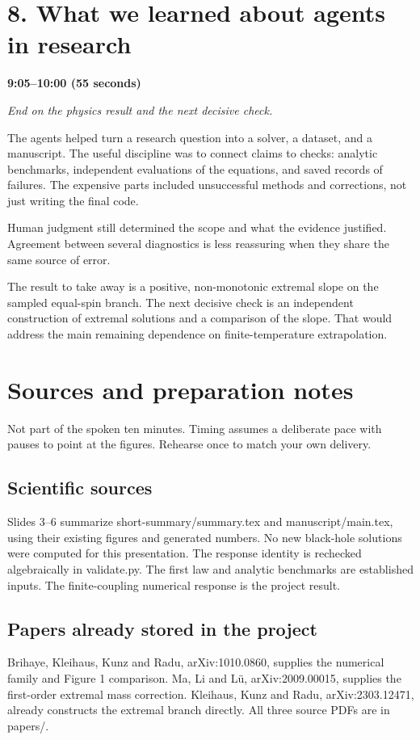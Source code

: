 \documentclass[12pt,a4paper]{article}
\begin{document}
\section*{8. What we learned about agents in research}
\textbf{9:05--10:00 (55 seconds)}\par
{\itshape End on the physics result and the next decisive check.}\par\medskip
The agents helped turn a research question into a solver, a dataset, and a manuscript. The useful discipline was to connect claims to checks: analytic benchmarks, independent evaluations of the equations, and saved records of failures. The expensive parts included unsuccessful methods and corrections, not just writing the final code.

Human judgment still determined the scope and what the evidence justified. Agreement between several diagnostics is less reassuring when they share the same source of error.

The result to take away is a positive, non-monotonic extremal slope on the sampled equal-spin branch. The next decisive check is an independent construction of extremal solutions and a comparison of the slope. That would address the main remaining dependence on finite-temperature extrapolation.
\newpage\section*{Sources and preparation notes}
Not part of the spoken ten minutes. Timing assumes a deliberate pace with pauses to point at the figures. Rehearse once to match your own delivery.
\subsection*{Scientific sources}
Slides 3--6 summarize short-summary/summary.tex and manuscript/main.tex, using their existing figures and generated numbers. No new black-hole solutions were computed for this presentation. The response identity is rechecked algebraically in validate.py. The first law and analytic benchmarks are established inputs. The finite-coupling numerical response is the project result.
\subsection*{Papers already stored in the project}
Brihaye, Kleihaus, Kunz and Radu, arXiv:1010.0860, supplies the numerical family and Figure 1 comparison. Ma, Li and Lü, arXiv:2009.00015, supplies the first-order extremal mass correction. Kleihaus, Kunz and Radu, arXiv:2303.12471, already constructs the extremal branch directly. All three source PDFs are in papers/.
\end{document}
